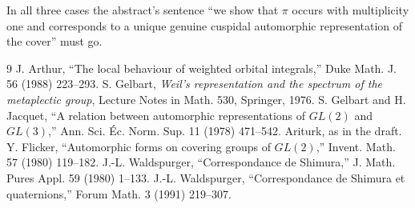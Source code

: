 \documentclass[12pt,letterpaper]{article}
\theoremstyle{plain}
\begin{document}
In all three cases the abstract's sentence ``we show that $\pi$ occurs with
multiplicity one and corresponds to a unique genuine cuspidal automorphic
representation of the cover'' must go.

\begin{thebibliography}{9}
 J. Arthur, ``The local behaviour of weighted orbital
integrals,'' Duke Math. J. 56 (1988) 223--293.
 S. Gelbart, \emph{Weil's representation and the
spectrum of the metaplectic group}, Lecture Notes in Math. 530, Springer,
1976.
 S. Gelbart and H. Jacquet, ``A relation between
automorphic representations of $GL(2)$ and $GL(3)$,'' Ann. Sci. \'Ec. Norm.
Sup. 11 (1978) 471--542.
 Ariturk, as in the draft.
 Y. Flicker, ``Automorphic forms on covering groups of
$GL(2)$,'' Invent. Math. 57 (1980) 119--182.
 J.-L. Waldspurger, ``Correspondance de Shimura,''
J. Math. Pures Appl. 59 (1980) 1--133.
 J.-L. Waldspurger, ``Correspondance de Shimura et
quaternions,'' Forum Math. 3 (1991) 219--307.
\end{thebibliography}
\end{document}

